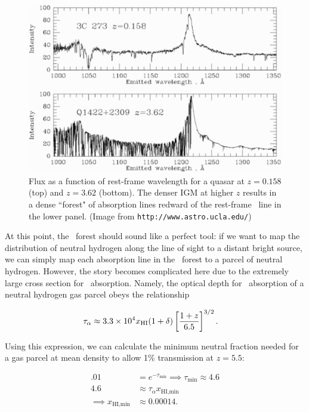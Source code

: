 \begin{figure}[h]
  \centering
  \includegraphics[width=12cm]{Lya-forest-60.eps}
  \caption{Flux as a function of rest-frame wavelength for a quasar at $z = 0.158$ (top) and $z = 3.62$ (bottom). The denser IGM at higher $z$ results in a dense ``forest" of absorption lines redward of the rest-frame \lya\ line in the lower panel. (Image from {\tt http://www.astro.ucla.edu/})}
  \label{fig:LyaExample}
\end{figure}

At this point, the \lya\ forest should sound like a perfect tool: if we want to map the distribution of neutral hydrogen along the line of sight to a distant bright source, we can simply map each absorption line in the \lya\ forest to a parcel of neutral hydrogen. However, the story becomes complicated here due to the extremely large cross section for \lya\ absorption. Namely, the optical depth for \lya\ absorption of a neutral hydrogen gas parcel obeys the relationship

\begin{align}
\tau_{\alpha} &\approx 3.3 \times 10^{4} x_{\text{HI}} (1 + \delta) \left[\dfrac{1+z}{6.5}\right]^{3/2}. \label{eq:tauGP}
\end{align}

Using this expression, we can calculate the minimum neutral fraction needed for a gas parcel at mean density to allow 1\% transmission at $z = 5.5$:

\begin{align}
.01 &= e^{-\tau_{\text{min}}} \implies \tau_{\text{min}} \approx 4.6\\
4.6 &\approx \tau_{\alpha} x_{\text{HI,min}} \\
\implies x_{\text{HI,min}} &\approx 0.00014.
\end{align}


